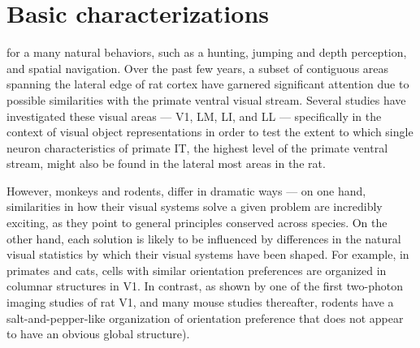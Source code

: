 
\chapter{Basic characterizations}



 for a many natural behaviors, such as a hunting\cite{REFREF}, jumping and depth perception\cite{REFREF}, and spatial navigation\cite{REFREF}. Over the past few years, a subset of contiguous areas spanning the lateral edge of rat cortex have garnered significant attention due to possible similarities with the primate ventral visual stream. Several studies \cite{Vermaercke2014, Tafazoli2017, Vinken2016NeuralCortex} have investigated these visual areas --- V1, LM, LI, and LL --- specifically in the context of visual object representations in order to test the extent to which single neuron characteristics of primate IT, the highest level of the primate ventral stream, might also be found in the lateral most areas in the rat. 

However, monkeys and rodents, differ in dramatic ways --- on one hand, similarities in how their visual systems solve a given problem are incredibly exciting, as they point to general principles conserved across species. On the other hand, each solution is likely to be influenced by differences in the natural visual statistics by which their visual systems have been shaped. For example, in primates and cats, cells with similar orientation preferences are organized in columnar structures in V1\cite{Blasdel1986}. In contrast, as shown by one of the first two-photon imaging studies of rat V1, and many mouse studies thereafter, rodents have a salt-and-pepper-like organization of orientation preference that does not appear to have an obvious global structure\cite{Ohki2005}). 

